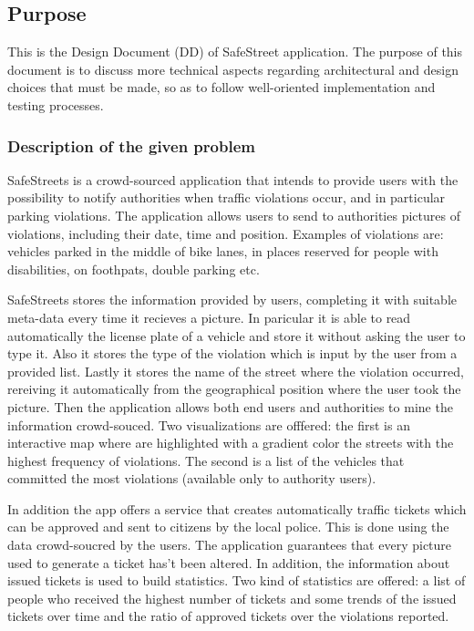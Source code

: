 \subsection{Purpose}
This is the Design Document (DD) of SafeStreet application. The purpose of this document is to discuss more technical aspects regarding architectural and design choices that must be made, so as to follow well-oriented implementation and testing processes.
\subsubsection{Description of the given problem}
SafeStreets is a crowd-sourced application that intends to provide users with the possibility to notify authorities when traffic violations occur, and in particular parking violations. The application allows users to send to authorities  pictures of violations, including their date, time and position. Examples of violations are: vehicles parked in the middle of bike lanes, in places reserved for people with disabilities, on foothpats, double parking etc.

SafeStreets stores the information provided by users, completing it with suitable meta-data every time it recieves a picture.
In paricular it is able to read automatically the license plate of a vehicle and store it without asking the user to type it.
Also it stores the type of the violation which is input by the user from a provided list.
Lastly it stores the name of the street where the violation occurred, rereiving it automatically from the geographical position where the user took the picture.
Then the application allows both end users and authorities to mine the information crowd-souced.
Two visualizations are offfered: the first is an interactive map where are highlighted with a gradient color the streets with the highest frequency of violations.
The second is a list of the vehicles that committed the most violations (available only to authority users).

In addition the app offers a service that creates automatically traffic tickets which can be approved and sent to citizens by the local police.  This is done using the data crowd-soucred by the users.
The application guarantees that every picture used to generate a ticket has't been altered.
In addition, the information about issued tickets is used to build statistics.
Two kind of statistics are offered: a list of people who received the highest number of tickets and some trends of the issued tickets over time and the ratio of approved tickets over the violations reported.

